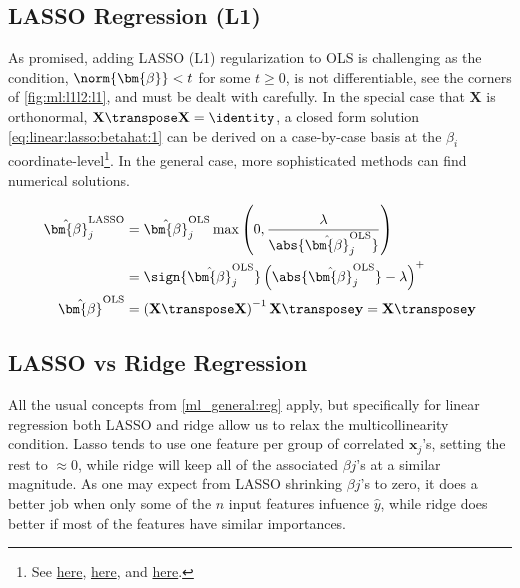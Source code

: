 \subsection{LASSO Regression (L1)}
\label{regression:linear:lasso}

As promised, adding LASSO (L1) regularization to OLS is challenging
as the condition, $\norm{\bm{\beta}} < t$ for some $t \geq 0$,
is not differentiable, see the corners of \cref{fig:ml:l1l2:l1}, and must be dealt with carefully.
In the special case that $\mathbf{X}$ is orthonormal, $\mathbf{X}\transpose \mathbf{X} = \identity$,
a closed form solution \cref{eq:linear:lasso:betahat:1} can be derived on a case-by-case basis
at the $\beta_{i}$ coordinate-level\footnote{See \href{https://stats.stackexchange.com/questions/17781/derivation-of-closed-form-lasso-solution}{here},
\href{https://en.wikipedia.org/wiki/Lasso_(statistics)\#Orthonormal_covariates}{here},
and \href{https://xavierbourretsicotte.github.io/lasso_derivation.html}{here}.}.
In the general case, more sophisticated methods can find numerical solutions.

\begin{subequations} \label{eq:linear:lasso:betahat_all}
\begin{align}
\hat{\bm{\beta}}^{\text{LASSO}}_{j}
&= \hat{\bm{\beta}}^{\text{OLS}}_{j} \max\left(0, \frac{\lambda}{\abs{\hat{\bm{\beta}}^{\text{OLS}}_{j}}}\right) \label{eq:linear:lasso:betahat:1} \\
&= \sign{\hat{\bm{\beta}}^{\text{OLS}}_{j}} \left(\abs{\hat{\bm{\beta}}^{\text{OLS}}_{j}} - \lambda\right)^{+} \label{eq:linear:lasso:betahat:2} \\
\hat{\bm{\beta}}^{\text{OLS}}
&= \left(\mathbf{X}\transpose\mathbf{X}\right)^{-1}\mathbf{X}\transpose \mathbf{y}
= \mathbf{X}\transpose \mathbf{y} \label{eq:lasso:modified_betahat_OLS}
\end{align}
\end{subequations}

\subsection{LASSO vs Ridge Regression}
\label{regression:linear:lasso_vs_ridge}

All the usual concepts from \cref{ml_general:reg} apply, but specifically for linear regression
both LASSO and ridge allow us to relax the multicollinearity condition.
Lasso tends to use one feature per group of correlated $\mathbf{x}_{j}$'s, setting the rest to $\approx 0$,
while ridge will keep all of the associated $\beta{j}$'s at a similar magnitude.
As one may expect from LASSO shrinking $\beta{j}$'s to zero,
it does a better job when only some of the $n$ input features infuence $\hat{y}$,
while ridge does better if most of the features have similar importances.

